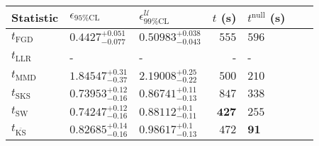 \begin{tabular}{l|llr|llr}
	Statistic & $\epsilon_{95\%\mathrm{CL}}$ & $\epsilon^    {\mathcal{U}}_{99\%\mathrm{CL}}$ & $t$ (s) & $t^{\mathrm{null}}$ (s) \\
	\midrule
	$t_{\mathrm{FGD}}$ & ${\mathbf{0.4427_{-0.077}^{+0.051}}}$ & ${\mathbf{0.50983_{-0.043}^{+0.038}}}$ & $555$ & $596$ \\
	$t_{\mathrm{LLR}}$ & - & - & - & - \\
	$t_{\mathrm{MMD}}$ & $1.84547_{-0.37}^{+0.31}$ & $2.19008_{-0.22}^{+0.25}$ & $500$ & $210$ \\
	$t_{\mathrm{SKS}}$ & $0.73953_{-0.16}^{+0.12}$ & $0.86741_{-0.13}^{+0.11}$ & $847$ & $338$ \\
	$t_{\mathrm{SW}}$ & $0.74247_{-0.16}^{+0.12}$ & $0.88112_{-0.11}^{+0.1}$ & ${\mathbf{427}}$ & $255$ \\
	$t_{\overline{\mathrm{KS}}}$ & $0.82685_{-0.16}^{+0.14}$ & $0.98617_{-0.13}^{+0.1}$ & $472$ & ${\mathbf{91}}$ \\
	\bottomrule
\end{tabular}